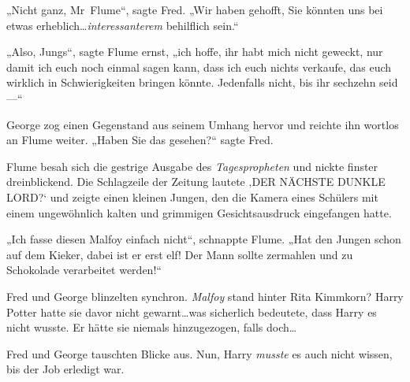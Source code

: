 „Nicht ganz, Mr~Flume“, sagte Fred. „Wir haben gehofft, Sie könnten uns bei etwas erheblich…\emph{interessanterem} behilflich sein.“

„Also, Jungs“, sagte Flume ernst, „ich hoffe, ihr habt mich nicht geweckt, nur damit ich euch noch einmal sagen kann, dass ich euch nichts verkaufe, das euch wirklich in Schwierigkeiten bringen könnte. Jedenfalls nicht, bis ihr sechzehn seid—“

George zog einen Gegenstand aus seinem Umhang hervor und reichte ihn wortlos an Flume weiter. „Haben Sie das gesehen?“ sagte Fred.

Flume besah sich die gestrige Ausgabe des \emph{Tagespropheten} und nickte finster dreinblickend. Die Schlagzeile der Zeitung lautete ‚DER NÄCHSTE DUNKLE LORD?‘ und zeigte einen kleinen Jungen, den die Kamera eines Schülers mit einem ungewöhnlich kalten und grimmigen Gesichtsausdruck eingefangen hatte.

„Ich fasse diesen Malfoy einfach nicht“, schnappte Flume. „Hat den Jungen schon auf dem Kieker, dabei ist er erst elf! Der Mann sollte zermahlen und zu Schokolade verarbeitet werden!“

Fred und George blinzelten synchron. \emph{Malfoy} stand hinter Rita Kimmkorn? Harry Potter hatte sie davor nicht gewarnt…was sicherlich bedeutete, dass Harry es nicht wusste. Er hätte sie niemals hinzugezogen, falls doch…

Fred und George tauschten Blicke aus. Nun, Harry \emph{musste} es auch nicht wissen, bis der Job erledigt war.

